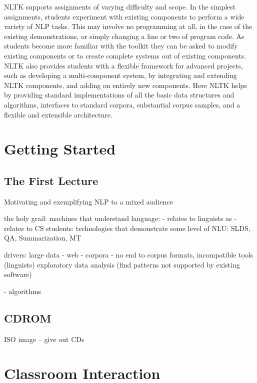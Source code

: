 \documentclass[11pt]{article}
\begin{document}
NLTK supports assignments of varying difficulty and scope. In the
simplest assignments, students experiment with existing components to
perform a wide variety of NLP tasks. This may involve no programming
at all, in the case of the existing demonstrations, or simply changing
a line or two of program code. As students become more familiar with
the toolkit they can be asked to modify existing components or to
create complete systems out of existing components. NLTK also provides
students with a flexible framework for advanced projects, such as
developing a multi-component system, by integrating and extending NLTK
components, and adding on entirely new components. Here NLTK helps by
providing standard implementations of all the basic data structures
and algorithms, interfaces to standard corpora, substantial corpus
samples, and a flexible and extensible architecture.

\section{Getting Started}
\label{sec:getting-started}

\subsection{The First Lecture}

Motivating and exemplifying NLP to a mixed audience

the holy grail: machines that understand language:
- relates to linguists as 
- relates to CS students: technologies that demonstrate some level of NLU:
  SLDS, QA, Summarization, MT

drivers: large data
- web
- corpora
- no end to corpus formats, incompatible tools (linguists)
  exploratory data analysis (find patterns not supported by existing software)



- algorithms


\subsection{CDROM}

ISO image -- give out CDs




\section{Classroom Interaction}
\label{sec:classroom-interaction}
\end{document}
